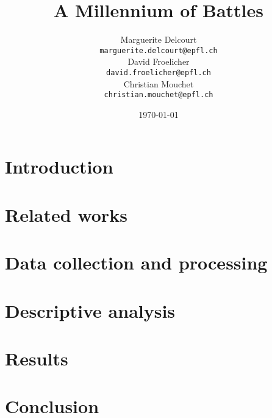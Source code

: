 \documentclass[11pt]{article}
\title{A Millennium of Battles}
\author{Marguerite Delcourt\\
  {\small \tt marguerite.delcourt@epfl.ch} \\
  \And
  David Froelicher\\
  {\small \tt david.froelicher@epfl.ch}\\
  \And
Christian Mouchet\\
{\small \tt christian.mouchet@epfl.ch} \\}
\date{\today}
\begin{document}
\maketitle

\begin{abstract}

\end{abstract}


\section{Introduction}


\section{Related works}


\section{Data collection and  processing}


\section{Descriptive analysis}


\section{Results}


\section{Conclusion}

\end{document}
